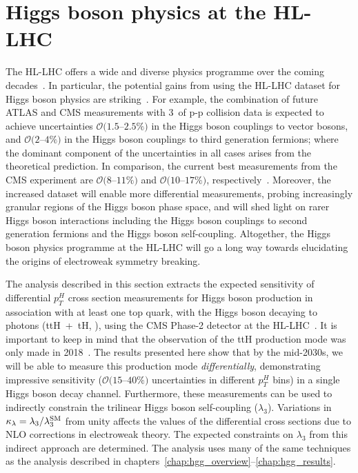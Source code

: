 \section{Higgs boson physics at the HL-LHC}\label{sec:trilinear}
The HL-LHC offers a wide and diverse physics programme over the coming decades~\cite{Atlas:2019qfx,Bediaga:2018lhg}. In particular, the potential gains from using the HL-LHC dataset for Higgs boson physics are striking~\cite{Cepeda:2019klc}. For example, the combination of future ATLAS and CMS measurements with 3~\abinv of p-p collision data is expected to achieve uncertainties $\mathcal{O}(1.5$--$2.5\%)$ in the Higgs boson couplings to vector bosons, and $\mathcal{O}(2$--$4\%)$ in the Higgs boson couplings to third generation fermions; where the dominant component of the uncertainties in all cases arises from the theoretical prediction. In comparison, the current best measurements from the CMS experiment are $\mathcal{O}(8$--$11\%)$ and $\mathcal{O}(10$--$17\%)$, respectively~\cite{Sirunyan:2020two}. Moreover, the increased dataset will enable more differential measurements, probing increasingly granular regions of the Higgs boson phase space, and will shed light on rarer Higgs boson interactions including the Higgs boson couplings to second generation fermions and the Higgs boson self-coupling. Altogether, the Higgs boson physics programme at the HL-LHC will go a long way towards elucidating the origins of electroweak symmetry breaking.

The analysis described in this section extracts the expected sensitivity of differential $p^H_T$ cross section measurements for Higgs boson production in association with at least one top quark, with the Higgs boson decaying to photons (ttH~+~tH, \Hgg), using the CMS Phase-2 detector at the HL-LHC~\cite{CMS-PAS-FTR-18-020}. It is important to keep in mind that the observation of the ttH production mode was only made in 2018~\cite{Sirunyan:2018hoz,Aaboud:2018urx}. The results presented here show that by the mid-2030s, we will be able to measure this production mode \textit{differentially}, demonstrating impressive sensitivity ($\mathcal{O}(15$--$40\%)$ uncertainties in different $p_T^H$ bins) in a single Higgs boson decay channel. Furthermore, these measurements can be used to indirectly constrain the trilinear Higgs boson self-coupling ($\lambda_3$). Variations in $\kappa_\lambda = \lambda_3/\lambda_3^{\rm{SM}}$ from unity affects the values of the differential cross sections due to NLO corrections in electroweak theory. The expected constraints on $\lambda_3$ from this indirect approach are determined. The analysis uses many of the same techniques as the \Hgg analysis described in chapters~\ref{chap:hgg_overview}--\ref{chap:hgg_results}.

